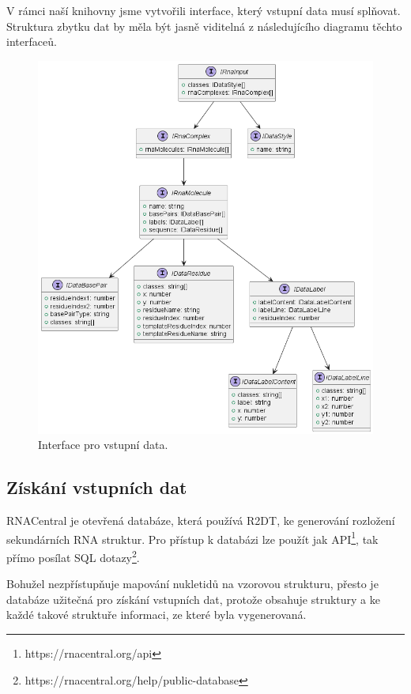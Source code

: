 V rámci naší knihovny jsme vytvořili interface, který vstupní data musí
splňovat. Struktura zbytku dat by měla být jasně viditelná z následujícího
diagramu těchto interfaceů.

\begin{figure}[H]
  \centering
  \includegraphics[width=145mm]{../img/kap03/rnaInput.png}
  \caption{Interface pro vstupní data.}
\end{figure}

\subsection{Získání vstupních dat}

RNACentral je otevřená databáze, která používá R2DT, ke generování rozložení
sekundárních RNA struktur. Pro přístup k databázi lze použít jak
API\footnote{https://rnacentral.org/api}, tak přímo posílat SQL
dotazy\footnote{https://rnacentral.org/help/public-database}.

Bohužel nezpřístupňuje mapování nukletidů na vzorovou strukturu, přesto je
databáze užitečná pro získání vstupních dat, protože obsahuje struktury a ke
každé takové struktuře informaci, ze které byla vygenerovaná. 

